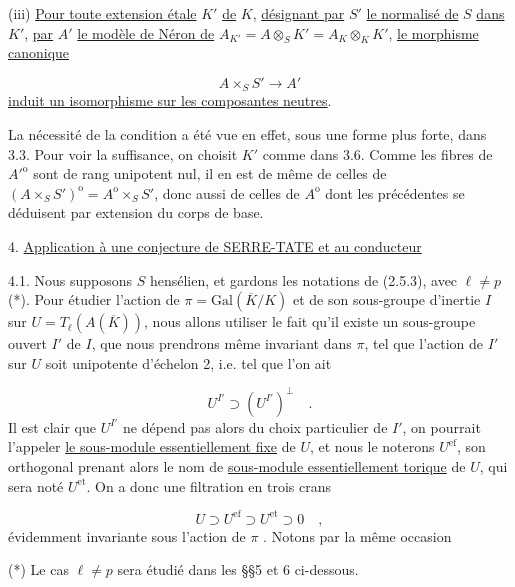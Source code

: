 (iii) \quad \underline{Pour toute extension étale} $K'$ \underline{de} $K$, \underline{désignant par} $S'$ \underline{le normalisé de} $S$ \underline{dans} $K'$, \underline{par} $A'$ \underline{le modèle de Néron de} $A_{K'} = A\otimes_S K'=A_K\otimes_K K'$, \underline{le morphisme canonique}



\begin{equation*}
A\times_S S' \longrightarrow A'
\end{equation*}
\underline{induit un isomorphisme sur les composantes neutres}.

La nécessité de la condition a été vue en effet, sous une forme plus forte, dans 3.3. Pour voir la suffisance, on choisit $K'$ comme dans 3.6. Comme les fibres de ${A'}^{\mathrm{o}}$ sont de rang unipotent nul, il en est de même de celles de $(A\times_S S')^{\mathrm{o}} = A^{\mathrm{o}}\times_S S'$, donc aussi de celles de $A^{\mathrm{o}}$ dont les précédentes se déduisent par extension du corps de base.


4. \underline{Application à une conjecture de SERRE-TATE et au conducteur}

4.1. \quad Nous supposons $S$ hensélien, et gardons les notations de (2.5.3), avec $\ell \neq p$ (*). Pour étudier l'action de $\pi = \mathrm{Gal}(\overline{K}/K)$ et de son sous-groupe d'inertie $I$ sur $U = T_\ell(A(\overline{K}))$, nous allons utiliser le fait qu'il existe un sous-groupe ouvert $I'$ de $I$, que nous prendrons même invariant dans $\pi$, tel que l'action de $I'$ sur $U$ soit unipotente d'échelon 2, i.e. tel que l'on ait

\begin{equation*}
U^{I'} \supset (U^{I'})^{\perp} \quad .
\end{equation*}
Il est clair que $U^{I'}$ ne dépend pas alors du choix particulier de $I'$, on pourrait l'appeler \underline{le sous-module essentiellement fixe} de $U$, et nous le noterons $U^{\mathrm{ef}}$, son orthogonal prenant alors le nom de \underline{sous-module essentiellement torique} de $U$, qui sera noté $U^{\mathrm{et}}$. On a donc une filtration en trois crans

\begin{equation}\tag{4.1.1}
U \supset U^{\mathrm{ef}} \supset U^{\mathrm{et}} \supset 0 \quad ,
\end{equation}
évidemment invariante sous l'action de $\pi$ . Notons par la même occasion

(*) Le cas $\ell \neq p$ sera étudié dans les \S\S 5 et 6 ci-dessous.


